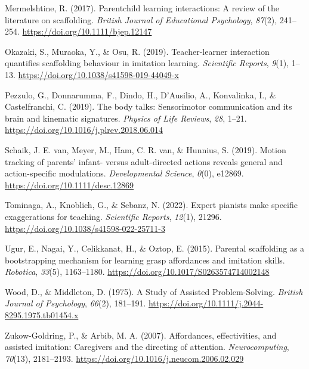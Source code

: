 \documentclass[
  man,floatsintext]{apa6}
\newlength{\cslhangindent}
\newlength{\cslentryspacingunit} %
\newenvironment{CSLReferences}[2] %
 {%
  \setlength{\parindent}{0pt}
  \ifodd #1
  \let\oldpar\par
  \def\par{\hangindent=\cslhangindent\oldpar}
  \fi
  \setlength{\parskip}{#2\cslentryspacingunit}
 }%
 {}
\begin{document}
\begin{CSLReferences}{1}{0}
\leavevmode{}%
Mermelshtine, R. (2017). Parent\textendash child learning interactions: {A} review of the literature on scaffolding. \emph{British Journal of Educational Psychology}, \emph{87}(2), 241--254. \url{https://doi.org/10.1111/bjep.12147}

\leavevmode{}%
Okazaki, S., Muraoka, Y., \& Osu, R. (2019). Teacher-learner interaction quantifies scaffolding behaviour in imitation learning. \emph{Scientific Reports}, \emph{9}(1), 1--13. \url{https://doi.org/10.1038/s41598-019-44049-x}

\leavevmode{}%
Pezzulo, G., Donnarumma, F., Dindo, H., D'Ausilio, A., Konvalinka, I., \& Castelfranchi, C. (2019). The body talks: {Sensorimotor} communication and its brain and kinematic signatures. \emph{Physics of Life Reviews}, \emph{28}, 1--21. \url{https://doi.org/10.1016/j.plrev.2018.06.014}

\leavevmode{}%
Schaik, J. E. van, Meyer, M., Ham, C. R. van, \& Hunnius, S. (2019). Motion tracking of parents' infant- versus adult-directed actions reveals general and action-specific modulations. \emph{Developmental Science}, \emph{0}(0), e12869. \url{https://doi.org/10.1111/desc.12869}

\leavevmode{}%
Tominaga, A., Knoblich, G., \& Sebanz, N. (2022). Expert pianists make specific exaggerations for teaching. \emph{Scientific Reports}, \emph{12}(1), 21296. \url{https://doi.org/10.1038/s41598-022-25711-3}

\leavevmode{}%
Ugur, E., Nagai, Y., Celikkanat, H., \& Oztop, E. (2015). Parental scaffolding as a bootstrapping mechanism for learning grasp affordances and imitation skills. \emph{Robotica}, \emph{33}(5), 1163--1180. \url{https://doi.org/10.1017/S0263574714002148}

\leavevmode{}%
Wood, D., \& Middleton, D. (1975). A {Study} of {Assisted Problem-Solving}. \emph{British Journal of Psychology}, \emph{66}(2), 181--191. \url{https://doi.org/10.1111/j.2044-8295.1975.tb01454.x}

\leavevmode{}%
Zukow-Goldring, P., \& Arbib, M. A. (2007). Affordances, effectivities, and assisted imitation: {Caregivers} and the directing of attention. \emph{Neurocomputing}, \emph{70}(13), 2181--2193. \url{https://doi.org/10.1016/j.neucom.2006.02.029}

\end{CSLReferences}
\end{document}
